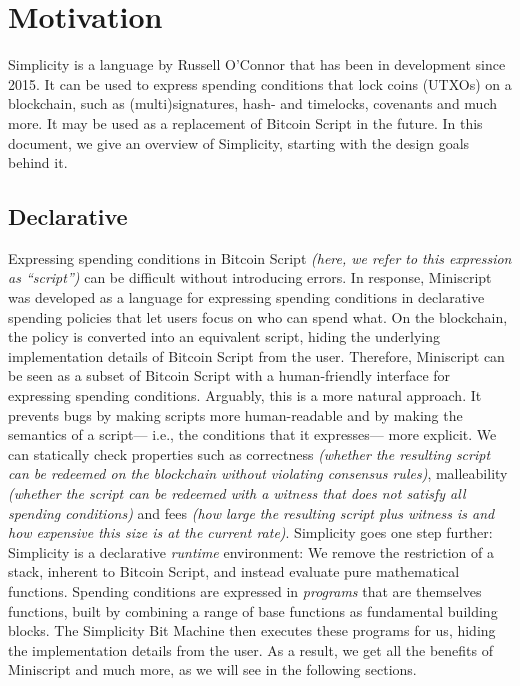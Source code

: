 \chapter{Motivation}%
\label{ch:motivation}

Simplicity is a language by Russell O'Connor that has been in development since 2015.
It can be used to express spending conditions that lock coins (UTXOs) on a blockchain,
such as (multi)signatures,
hash- and timelocks,
covenants and much more.
It may be used as a replacement of Bitcoin Script in the future.
In this document,
we give an overview of Simplicity,
starting with the design goals behind it.

\section{Declarative}


Expressing spending conditions in Bitcoin Script \emph{(here, we refer to this expression as \enquote{script})}
can be difficult without introducing errors.
In response,
Miniscript was developed as a language for expressing spending conditions in declarative spending policies
that let users focus on who can spend what.
On the blockchain,
the policy is converted into an equivalent script,
hiding the underlying implementation details of Bitcoin Script from the user.
Therefore,
Miniscript can be seen as a subset of Bitcoin Script with a human-friendly interface for expressing spending conditions.
%
Arguably,
this is a more natural approach.
It prevents bugs by making scripts more human-readable
and by making the semantics of a script---%
i.e., the conditions that it expresses---%
more explicit.
We can statically check properties such as
correctness \emph{(whether the resulting script can be redeemed on the blockchain without violating consensus rules)},
malleability \emph{(whether the script can be redeemed with a witness that does not satisfy all spending conditions)}
and fees \emph{(how large the resulting script plus witness is and how expensive this size is at the current rate)}.
%
Simplicity goes one step further: Simplicity is a declarative \emph{runtime} environment:
We remove the restriction of a stack,
inherent to Bitcoin Script,
and instead evaluate pure mathematical functions.
Spending conditions are expressed in \emph{programs} that are themselves functions,
built by combining a range of base functions as fundamental building blocks.
The Simplicity Bit Machine then executes these programs for us,
hiding the implementation details from the user.
As a result,
we get all the benefits of Miniscript and much more,
as we will see in the following sections.

